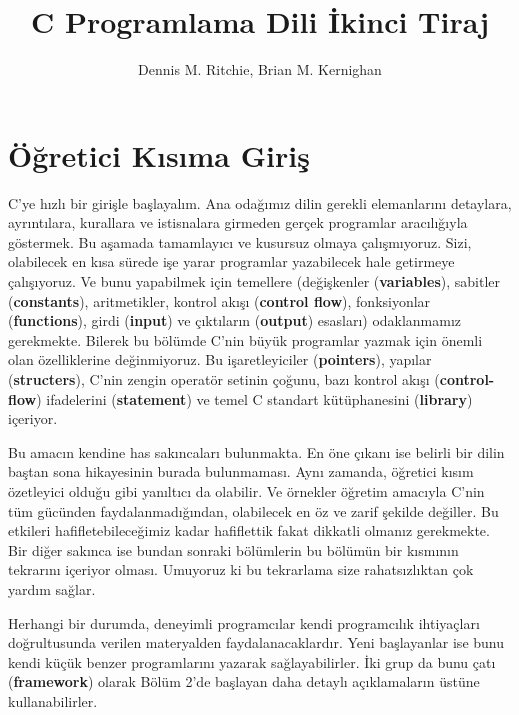 \documentclass[a4paper,12pt,oneside]{book}
\begin{document}
\author{Dennis M. Ritchie, Brian M. Kernighan}
\title{C Programlama Dili İkinci Tiraj}
\date{}




\maketitle

\chapter{Öğretici Kısıma Giriş}
C'ye hızlı bir girişle başlayalım. Ana odağımız dilin gerekli elemanlarını detaylara, ayrıntılara, kurallara ve istisnalara girmeden gerçek programlar aracılığıyla göstermek. Bu aşamada tamamlayıcı ve kusursuz olmaya çalışmıyoruz. Sizi, olabilecek en kısa sürede işe yarar programlar yazabilecek hale getirmeye çalışıyoruz. Ve bunu yapabilmek için temellere (değişkenler (\textbf{variables}), sabitler (\textbf{constants}), aritmetikler, kontrol akışı (\textbf{control flow}), fonksiyonlar (\textbf{functions}), girdi (\textbf{input}) ve çıktıların (\textbf{output}) esasları) odaklanmamız gerekmekte. Bilerek bu bölümde C'nin büyük programlar yazmak için önemli olan özelliklerine değinmiyoruz. Bu işaretleyiciler (\textbf{pointers}), yapılar (\textbf{structers}), C'nin zengin operatör setinin çoğunu, bazı kontrol akışı (\textbf{control-flow}) ifadelerini (\textbf{statement}) ve temel C standart kütüphanesini (\textbf{library}) içeriyor.
\par Bu amacın kendine has sakıncaları bulunmakta. En öne çıkanı ise belirli bir dilin baştan sona hikayesinin burada bulunmaması. Aynı zamanda, öğretici kısım özetleyici olduğu gibi yanıltıcı da olabilir. Ve örnekler öğretim amacıyla C'nin tüm gücünden faydalanmadığından, olabilecek en öz ve zarif şekilde değiller. Bu etkileri hafifletebileceğimiz kadar hafiflettik fakat dikkatli olmanız gerekmekte. Bir diğer sakınca ise bundan sonraki bölümlerin bu bölümün bir kısmının tekrarını içeriyor olması. Umuyoruz ki bu tekrarlama size rahatsızlıktan çok yardım sağlar.
\par Herhangi bir durumda, deneyimli programcılar kendi programcılık ihtiyaçları doğrultusunda verilen materyalden faydalanacaklardır. Yeni başlayanlar ise bunu kendi küçük benzer programlarını yazarak sağlayabilirler. İki grup da bunu çatı (\textbf{framework}) olarak Bölüm 2'de başlayan daha detaylı açıklamaların üstüne kullanabilirler.
\end{document}
